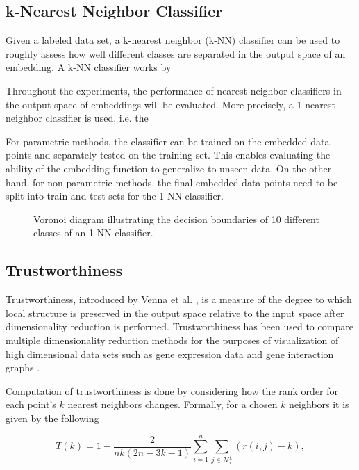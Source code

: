 \subsection{k-Nearest Neighbor Classifier}

Given a labeled data set, a k-nearest neighbor (k-NN) classifier can be used to roughly assess how well different classes are separated in the output space of an embedding. A k-NN classifier works by 

Throughout the experiments, the performance of nearest neighbor classifiers in the output space of embeddings will be evaluated. More precisely, a 1-nearest neighbor classifier is used, i.e. the 

For parametric methods, the classifier can be trained on the embedded data points and separately tested on the training set. This enables evaluating the ability of the embedding function to generalize to unseen data. On the other hand, for non-parametric methods, the final embedded data points need to be split into train and test sets for the 1-NN classifier.

\begin{figure}[!htb]
  \centering
  \resizebox{0.5\textwidth}{!}{\unskip}
  \caption{Voronoi diagram illustrating the decision boundaries of 10 different classes of an 1-NN classifier.}
  \label{fig:voronoi}
\end{figure}

\subsection{Trustworthiness}

Trustworthiness, introduced by Venna et al. \cite{trustworthiness}, is a measure of the degree to which local structure is preserved in the output space relative to the input space after dimensionality reduction is performed. Trustworthiness has been used to compare multiple dimensionality reduction methods for the purposes of visualization of high dimensional data sets such as gene expression data \cite{trustworthiness_gene_expression} and gene interaction graphs \cite{trustworthiness_gene_interaction}.

Computation of trustworthiness is done by considering how the rank order for each point's $k$ nearest neighbors changes. Formally, for a chosen $k$ neighbors it is given by the following 

$$T(k) = 1 - \frac{2}{nk (2n - 3k - 1)} \sum^{n}_{i=1} \sum_{j \in \mathcal{N}_{i}^{k}} (r(i, j) - k),$$

